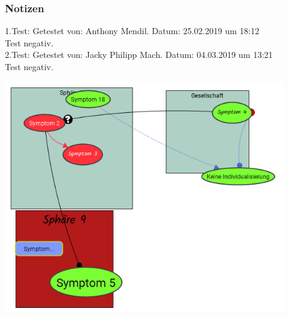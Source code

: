 \documentclass[enabledeprecatedfontcommands]{scrartcl}
\begin{document}
\subsubsection{Notizen}
1.Test: Getestet von: Anthony Mendil. Datum: 25.02.2019 um 18:12  \\
Test negativ. \\
2.Test: Getestet von: Jacky Philipp Mach. Datum: 04.03.2019 um 13:21 \\
Test negativ.
\begin{center}
\includegraphics[height=10cm]{3_57.PNG}
\end{center}
\end{document}
